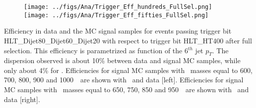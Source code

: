 \begin{frame}{}
\vspace{-.2cm}
\begin{figure}[!Hhtbp]
  \begin{center}
    \texttt{[image: ../figs/Ana/Trigger\_Eff\_hundreds\_FullSel.png]}
    \texttt{[image: ../figs/Ana/Trigger\_Eff\_fifties\_FullSel.png]}
  \end{center}
\end{figure}

\vspace{-.2cm}
    \begin{block}{}
      \tiny \centering Efficiency in data and the MC signal samples for events passing trigger bit HLT\_Dijet80\_Dijet60\_Dijet20 with respect to trigger bit HLT\_HT400 after full selection. This efficiency is parametrized as function of the 6$^{th}$ jet $p_{T}$. The dispersion observed is about 10\% between data and signal MC samples, while only about 4\%  for \ttbar. Efficiencies for signal MC samples with \Tp~masses equal to 600, 700, 800, 900 and 1000~\GeVcc~are shown with \ttbar~and data [left]. Efficiencies for signal MC samples with \Tp~masses equal to 650, 750, 850 and 950~\GeVcc~are shown with \ttbar~and data [right].
    \end{block}

\end{frame}


\begin{frame}{}
\vspace{-.2cm}

\vspace{-.2cm}
    \begin{block}{}
      \tiny \centering 
    \end{block}

\end{frame}